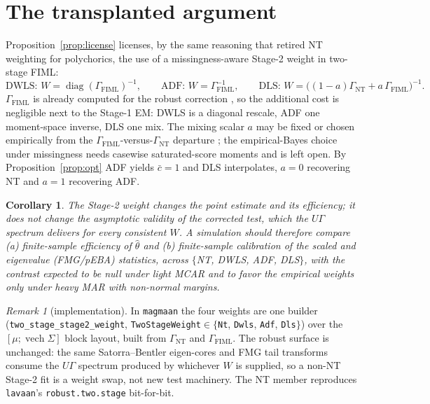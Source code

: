 \documentclass[11pt]{article}
\newcommand{\vech}{\operatorname{vech}}
\newcommand{\Gnt}{\Gamma_{\mathrm{NT}}}
\newcommand{\Gfiml}{\Gamma_{\mathrm{FIML}}}
\theoremstyle{plain}
\newtheorem{corollary}{Corollary}
\theoremstyle{remark}
\newtheorem*{remark}{Remark}
\begin{document}
\section{The transplanted argument}

Proposition~\ref{prop:license} licenses, by the same reasoning that retired NT
weighting for polychorics, the use of a missingness-aware Stage-2 weight in
two-stage FIML:
\[
  \text{DWLS: } W=\operatorname{diag}(\Gfiml)^{-1},\qquad
  \text{ADF: } W=\Gfiml^{-1},\qquad
  \text{DLS: } W=\big((1-a)\Gnt+a\,\Gfiml\big)^{-1}.
\]
$\Gfiml$ is already computed for the robust correction \cite{SavaleiBentler2009},
so the additional cost is negligible next to the Stage-1 EM: DWLS is a diagonal
rescale, ADF one moment-space inverse, DLS one mix. The mixing scalar $a$ may be
fixed or chosen empirically from the $\Gfiml$-versus-$\Gnt$ departure
\cite{DuWu2024}; the empirical-Bayes choice under missingness needs casewise
saturated-score moments and is left open. By Proposition~\ref{prop:opt} ADF
yields $\bar c=1$ and DLS interpolates, $a=0$ recovering NT and $a=1$ recovering
ADF.

\begin{corollary}
The Stage-2 weight changes the point estimate and its efficiency; it does not
change the asymptotic validity of the corrected test, which the $U\Gamma$
spectrum delivers for every consistent $W$. A simulation should therefore
compare (a) finite-sample efficiency of $\hat\theta$ and (b) finite-sample
calibration of the scaled and eigenvalue (FMG/pEBA) statistics, across
$\{$NT, DWLS, ADF, DLS$\}$, with the contrast expected to be null under light
MCAR and to favor the empirical weights only under heavy MAR with non-normal
margins.
\end{corollary}

\begin{remark}[implementation]
In \texttt{magmaan} the four weights are one builder
(\texttt{two\_stage\_stage2\_weight}, \texttt{TwoStageWeight}$\in\{$\texttt{Nt},
\texttt{Dwls}, \texttt{Adf}, \texttt{Dls}$\}$) over the
$[\mu;\vech\Sigma]$ block layout, built from $\Gnt$ and $\Gfiml$. The robust
surface is unchanged: the same Satorra--Bentler eigen-cores and FMG tail
transforms consume the $U\Gamma$ spectrum produced by whichever $W$ is supplied,
so a non-NT Stage-2 fit is a weight swap, not new test machinery. The NT member
reproduces \texttt{lavaan}'s \texttt{robust.two.stage} bit-for-bit.
\end{remark}
\end{document}

